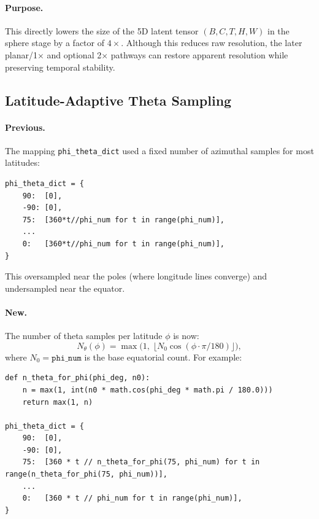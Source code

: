 \documentclass[11pt,a4paper]{article}
\newcommand{\fn}[1]{\texttt{#1}}
\begin{document}
\paragraph{Purpose.}
This directly lowers the size of the 5D latent tensor \((B,C,T,H,W)\) in the sphere stage by a factor of \(4\times\).
Although this reduces raw resolution, the later planar/1$\times$ and optional 2$\times$ pathways can restore apparent resolution while preserving temporal stability.

\subsection{Latitude-Adaptive Theta Sampling}

\paragraph{Previous.}
The mapping \fn{phi\_theta\_dict} used a fixed number of azimuthal samples for most latitudes:
\begin{lstlisting}
phi_theta_dict = {
    90:  [0],
    -90: [0],
    75:  [360*t//phi_num for t in range(phi_num)],
    ...
    0:   [360*t//phi_num for t in range(phi_num)],
}
\end{lstlisting}
This oversampled near the poles (where longitude lines converge) and undersampled near the equator.

\paragraph{New.}
The number of theta samples per latitude \(\phi\) is now:
\begin{equation}
    N_\theta(\phi) = \max\bigl(1,\;\lfloor N_0 \cos(\phi \cdot \pi/180)\rfloor\bigr),
\end{equation}
where \(N_0=\texttt{phi\_num}\) is the base equatorial count.
For example:
\begin{lstlisting}
def n_theta_for_phi(phi_deg, n0):
    n = max(1, int(n0 * math.cos(phi_deg * math.pi / 180.0)))
    return max(1, n)

phi_theta_dict = {
    90:  [0],
    -90: [0],
    75:  [360 * t // n_theta_for_phi(75, phi_num) for t in range(n_theta_for_phi(75, phi_num))],
    ...
    0:   [360 * t // phi_num for t in range(phi_num)],
}
\end{lstlisting}
\end{document}
